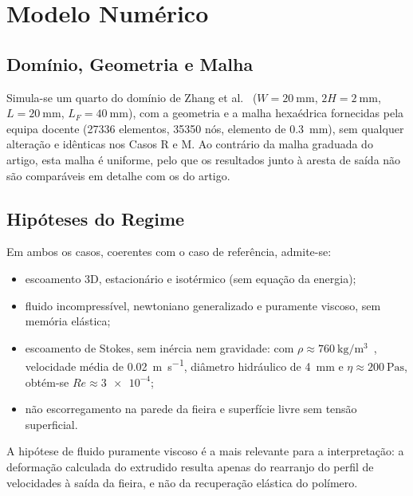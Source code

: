 
\section{Modelo Numérico}
\label{sec:modelo}

\subsection{Domínio, Geometria e Malha}
\label{subsec:dominio}

Simula-se um quarto do domínio de Zhang et al.~\cite{Zhang2026Anisotropic} ($W = \qty{20}{\milli\metre}$, $2H = \qty{2}{\milli\metre}$, $L = \qty{20}{\milli\metre}$, $L_F = \qty{40}{\milli\metre}$), com a geometria e a malha hexaédrica fornecidas pela equipa docente (\num{27336} elementos, \num{35350} nós, elemento de \qty{0,3}{\milli\metre}), sem qualquer alteração e idênticas nos Casos R e M. Ao contrário da malha graduada do artigo, esta malha é uniforme, pelo que os resultados junto à aresta de saída não são comparáveis em detalhe com os do artigo.

\subsection{Hipóteses do Regime}
\label{subsec:hipoteses}

Em ambos os casos, coerentes com o caso de referência, admite-se:
\begin{itemize}
    \item escoamento 3D, estacionário e isotérmico (sem equação da energia);
    \item fluido incompressível, newtoniano generalizado e puramente viscoso, sem memória elástica;
    \item escoamento de Stokes, sem inércia nem gravidade: com $\rho \approx \qty{760}{\kilo\gram\per\metre\cubed}$~\cite{FichaMoplen}, velocidade média de \qty{0,02}{\metre\per\second}, diâmetro hidráulico de \qty{4}{\milli\metre} e $\eta \approx \qty{200}{\pascal\second}$, obtém-se $Re \approx \num{3e-4}$;
    \item não escorregamento na parede da fieira e superfície livre sem tensão superficial.
\end{itemize}
A hipótese de fluido puramente viscoso é a mais relevante para a interpretação: a deformação calculada do extrudido resulta apenas do rearranjo do perfil de velocidades à saída da fieira, e não da recuperação elástica do polímero.

